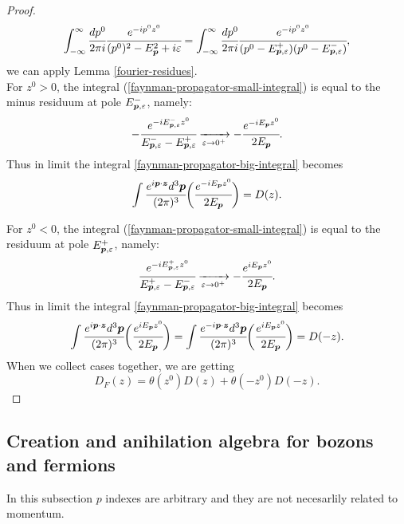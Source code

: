 \documentclass[main.tex]{subfiles}
\begin{document}
\begin{proof}
\begin{equation}
\label{faynman-propagator-small-integral}
\int_{-\infty}^\infty \cfrac{dp^0}{2\pi i} \cfrac{e^{-ip^0z^0}}{(p^0)^2 - E^2_{\boldsymbol{p}} + i\varepsilon}
= \int_{-\infty}^\infty \cfrac{dp^0}{2\pi i} \cfrac{e^{-ip^0z^0}}{(p^0 - E^{+}_{\boldsymbol{p}, \varepsilon})(p^0 - E^{-}_{\boldsymbol{p}, \varepsilon})},
\end{equation}
we can apply Lemma \ref{fourier-residues}.\\
For $z^0 > 0$, the integral (\ref{faynman-propagator-small-integral}) is equal to the minus residuum at pole $E^{-}_{\boldsymbol{p},  \varepsilon}$, namely:
\begin{equation}
-\cfrac{e^{-i E^{-}_{\boldsymbol{p},  \varepsilon} z^0}}{E^{-}_{\boldsymbol{p},  \varepsilon} - E^{+}_{\boldsymbol{p},  \varepsilon}} \xrightarrow[\varepsilon \to 0^+]{} - \cfrac{e^{-i E_{\boldsymbol{p}} z^0}}{2E_{\boldsymbol{p}}}.
\end{equation}
Thus in limit the integral \ref{faynman-propagator-big-integral} becomes
\begin{equation}
\int \cfrac{e^{i\boldsymbol{p}\cdot\boldsymbol{z}}d^3 \boldsymbol{p}}{(2\pi)^3}
\bigg( \cfrac{e^{-i E_{\boldsymbol{p}}z^0 }}{2E_{\boldsymbol{p}}} \bigg) = D(z).
\end{equation}


For $z^0 < 0$, the integral (\ref{faynman-propagator-small-integral}) is equal to the residuum at pole $E^{+}_{\boldsymbol{p},  \varepsilon}$, namely:
\begin{equation}
\cfrac{e^{-i E^{+}_{\boldsymbol{p},  \varepsilon} z^0}}{E^{+}_{\boldsymbol{p},  \varepsilon} - E^{-}_{\boldsymbol{p},  \varepsilon}} \xrightarrow[\varepsilon \to 0^+]{} -\cfrac{e^{i E_{\boldsymbol{p}} z^0}}{2E_{\boldsymbol{p}}}.
\end{equation}
Thus in limit the integral \ref{faynman-propagator-big-integral} becomes
\begin{equation}
\int \cfrac{e^{i\boldsymbol{p}\cdot\boldsymbol{z}}d^3 \boldsymbol{p}}{(2\pi)^3}
\bigg( \cfrac{e^{i E_{\boldsymbol{p}}z^0 }}{2E_{\boldsymbol{p}}} \bigg) = 
\int \cfrac{e^{-i\boldsymbol{p}\cdot\boldsymbol{z}}d^3 \boldsymbol{p}}{(2\pi)^3}
\bigg( \cfrac{e^{i E_{\boldsymbol{p}}z^0 }}{2E_{\boldsymbol{p}}} \bigg) = D(-z).
\end{equation}
When we collect cases together, we are getting
\begin{equation}
D_F(z) = \theta(z^0)D(z) + \theta(-z^0)D(-z). 
\end{equation}
\end{proof}


\subsection{Creation and anihilation algebra for bozons and fermions}
In this subsection $p$ indexes are arbitrary and they are not necesarlily related to momentum. 
\end{document}
